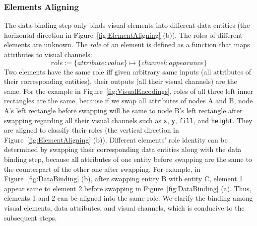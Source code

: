 \subsubsection{Elements Aligning}
The data-binding step only binds visual elements into different data entities (the horizontal direction in Figure~\ref{fig:ElementAligning} (b)).
The roles of different elements are unknown.
The \textit{role} of an element is defined as a function that maps attributes to visual channels:
\begin{equation}
    role :=  \{attribute: value\} \mapsto \{channel: appearance\}
\end{equation}
Two elements have the same role iff given arbitrary same inputs (all attributes of their corresponding entities), their outputs (all their visual channels) are the same.
For the example in Figure~\ref{fig:VisualEncodings}, 
roles of all three left inner rectangles are the same,
because if we swap all attributes of nodes A and B, node A's left rectangle before swapping will be same to node B's left rectangle after swapping regarding all their visual channels such as \texttt{x}, \texttt{y}, \texttt{fill}, and \texttt{height}.
They are aligned to classify their roles (the vertical direction in Figure~\ref{fig:ElementAligning} (b)).
Different elements' role identity can be determined by swapping their corresponding data entities along with the data binding step, because all attributes of one entity before swapping are the same to the counterpart of the other one after swapping.
For example, in Figure~\ref{fig:DataBinding} (b), after swapping entity B with entity C, element 1 appear same to element 2 before swapping in Figure~\ref{fig:DataBinding} (a). Thus, elements 1 and 2 can be aligned into the same role.
We clarify the binding among visual elements, data attributes, and visual channels, which is conducive to the subsequent steps.


